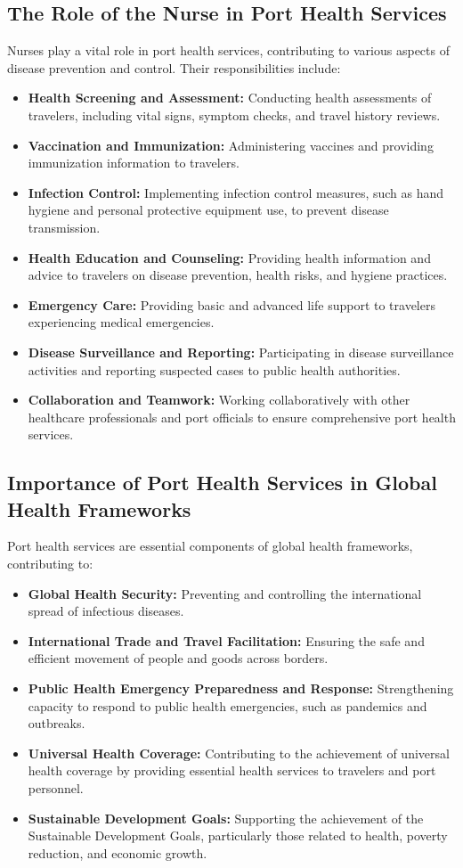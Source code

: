 \documentclass[12pt,a4paper]{article}
\begin{document}
\subsection*{The Role of the Nurse in Port Health Services}
Nurses play a vital role in port health services, contributing to various aspects of disease prevention and control. Their responsibilities include:
\begin{itemize}
    \item \textbf{Health Screening and Assessment:} Conducting health assessments of travelers, including vital signs, symptom checks, and travel history reviews.
    \item \textbf{Vaccination and Immunization:} Administering vaccines and providing immunization information to travelers.
    \item \textbf{Infection Control:} Implementing infection control measures, such as hand hygiene and personal protective equipment use, to prevent disease transmission.
    \item \textbf{Health Education and Counseling:} Providing health information and advice to travelers on disease prevention, health risks, and hygiene practices.
    \item \textbf{Emergency Care:} Providing basic and advanced life support to travelers experiencing medical emergencies.
    \item \textbf{Disease Surveillance and Reporting:} Participating in disease surveillance activities and reporting suspected cases to public health authorities.
    \item \textbf{Collaboration and Teamwork:} Working collaboratively with other healthcare professionals and port officials to ensure comprehensive port health services.
\end{itemize}

\subsection*{Importance of Port Health Services in Global Health Frameworks}
Port health services are essential components of global health frameworks, contributing to:
\begin{itemize}
    \item \textbf{Global Health Security:} Preventing and controlling the international spread of infectious diseases.
    \item \textbf{International Trade and Travel Facilitation:} Ensuring the safe and efficient movement of people and goods across borders.
    \item \textbf{Public Health Emergency Preparedness and Response:} Strengthening capacity to respond to public health emergencies, such as pandemics and outbreaks.
    \item \textbf{Universal Health Coverage:} Contributing to the achievement of universal health coverage by providing essential health services to travelers and port personnel.
    \item \textbf{Sustainable Development Goals:} Supporting the achievement of the Sustainable Development Goals, particularly those related to health, poverty reduction, and economic growth.
\end{itemize}
\end{document}
